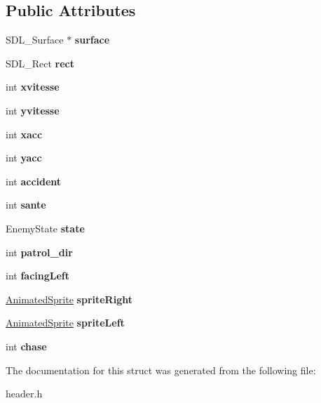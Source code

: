 \subsection*{Public Attributes}
\begin{DoxyCompactItemize}
\item 
\mbox{\label{structminibox_a571c9e29b790d024f8cfd0642190744b}} 
S\+D\+L\+\_\+\+Surface $\ast$ {\bfseries surface}
\item 
\mbox{\label{structminibox_ac21698b8e91affc5bb381d48327d16d5}} 
S\+D\+L\+\_\+\+Rect {\bfseries rect}
\item 
\mbox{\label{structminibox_a0f15ad467c6be08d84d9babd9439dbfa}} 
int {\bfseries xvitesse}
\item 
\mbox{\label{structminibox_a340d9ec37887abc1a2732c7a0076bd6c}} 
int {\bfseries yvitesse}
\item 
\mbox{\label{structminibox_acf849c664f51543a5afacb8233d669c0}} 
int {\bfseries xacc}
\item 
\mbox{\label{structminibox_a75753c3958c711f9b272fbbc51aea2c9}} 
int {\bfseries yacc}
\item 
\mbox{\label{structminibox_a73355ddfc131585fec6aed49d4168e49}} 
int {\bfseries accident}
\item 
\mbox{\label{structminibox_a6fe4a0b46bd6f862db774085dcc3f42e}} 
int {\bfseries sante}
\item 
\mbox{\label{structminibox_a685e2bbceba1d7c6d5b82ba67288b1cd}} 
Enemy\+State {\bfseries state}
\item 
\mbox{\label{structminibox_ac33fd0e8b9e74d1e48ebe6161f6b1b58}} 
int {\bfseries patrol\+\_\+dir}
\item 
\mbox{\label{structminibox_a11e514c3b24e290dc90c92f3bef45c43}} 
int {\bfseries facing\+Left}
\item 
\mbox{\label{structminibox_a4a90e5b68bea0bcedee6b60b810b342f}} 
\hyperlink{structAnimatedSprite}{Animated\+Sprite} {\bfseries sprite\+Right}
\item 
\mbox{\label{structminibox_a406076968790710a0f03e76455239fd6}} 
\hyperlink{structAnimatedSprite}{Animated\+Sprite} {\bfseries sprite\+Left}
\item 
\mbox{\label{structminibox_a145b58a92d721ede3f4013cdc7dd30ba}} 
int {\bfseries chase}
\end{DoxyCompactItemize}


The documentation for this struct was generated from the following file\+:\begin{DoxyCompactItemize}
\item 
header.\+h\end{DoxyCompactItemize}
